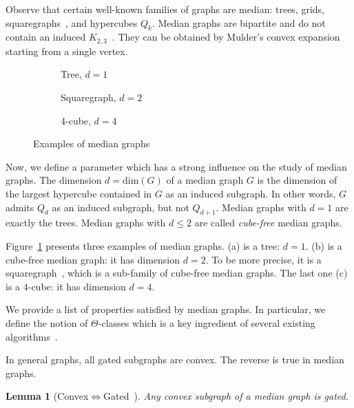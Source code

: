\documentclass{article}
\newtheorem{lemma}{Lemma}
\begin{document}
Observe that certain well-known families of graphs are median: trees, grids, squaregraphs~\cite{BaChEp10}, and hypercubes $Q_k$.
Median graphs are bipartite and do not contain an induced $K_{2,3}$~\cite{BaCh08,HaImKl11,Mu78}. They can be obtained by Mulder's convex expansion~\cite{Mu78,Mu80} starting from a single vertex.

\begin{figure}[h]

\begin{subfigure}[b]{0.33\columnwidth}
\centering
\scalebox{0.6}{}
\caption{Tree, $d=1$}
\end{subfigure}
\begin{subfigure}[b]{0.33\columnwidth}
\centering
\scalebox{0.6}{}
\caption{Squaregraph, $d=2$}
\end{subfigure}
\begin{subfigure}[b]{0.33\columnwidth}
\centering
\scalebox{0.6}{}
\caption{4-cube, $d=4$}
\end{subfigure}

\caption{Examples of median graphs}
\label{fig:median_examples}
\end{figure}

Now, we define a parameter which has a strong influence on the study of median graphs.
The dimension $d = \mbox{dim}(G)$ of a median graph $G$ is the dimension of the largest hypercube contained in $G$ as an induced subgraph.
In other words, $G$ admits $Q_d$ as an induced subgraph, but not $Q_{d+1}$. Median graphs with $d=1$ are exactly the trees. Median graphs with $d\le 2$ are called \textit{cube-free} median graphs.

Figure~\ref{fig:median_examples} presents three examples of median graphs. (a) is a tree: $d=1$. (b) is a cube-free median graph: it has dimension $d=2$. To be more precise, it is a squaregraph~\cite{BaChEp10}, which is a sub-family of cube-free median graphs. The last one (c) is a 4-cube: it has dimension $d=4$. 

We provide a list of properties satisfied by median graphs. In particular, we define the notion of $\Theta$-classes which is a key ingredient of several existing algorithms~\cite{BeChChVa20,HaImKl99,ImKlMu99}.

In general graphs, all gated subgraphs are convex. The reverse is true in median graphs.
\begin{lemma}[Convex$\Leftrightarrow$Gated~\cite{BaCh08,BeChChVa20}]
Any convex subgraph of a median graph is gated.
\end{lemma}
\end{document}
